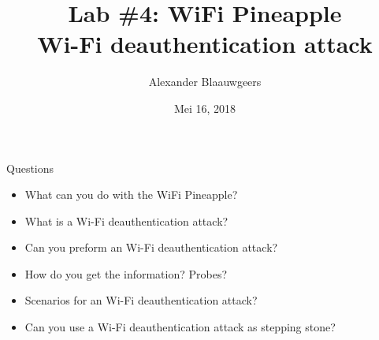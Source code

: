 \documentclass[10pt]{beamer}
\title[]{Lab \#4: WiFi Pineapple \\ Wi-Fi deauthentication attack \\  } %
\author{Alexander Blaauwgeers} %
\institute[University of Amsterdam] %
{
University of Amsterdam \\ %
\medskip
}
\date{Mei 16, 2018} %
\begin{document}
\begin{frame}
\titlepage %
\end{frame}


\begin{frame}{Questions}

\begin{itemize}
    \item What can you do with the WiFi Pineapple?
    \item What is a Wi-Fi deauthentication attack?
    \item Can you preform an Wi-Fi deauthentication attack?
\end{itemize}

\begin{itemize}
    \item How do you get the information? Probes?
    \item Scenarios for an Wi-Fi deauthentication attack?
    \item Can you use a Wi-Fi deauthentication attack as stepping stone?
\end{itemize}
\end{frame}

\end{document}
